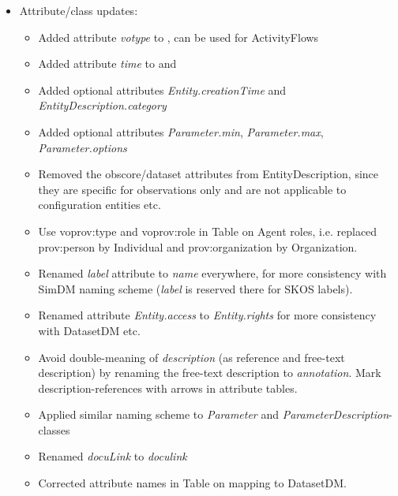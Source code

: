 \begin{itemize}
\item Attribute/class updates:
\begin{itemize}
    \item Added attribute \emph{votype} to , can be used for ActivityFlows
    \item Added attribute \emph{time} to  and 
    \item Added optional attributes \emph{Entity.creationTime} and \emph{EntityDescription.category}
    \item Added optional attributes \emph{Parameter.min},  \emph{Parameter.max},  \emph{Parameter.options}
    \item Removed the obscore/dataset attributes from EntityDescription, since they are specific for observations only and are not applicable to configuration entities etc.
    \item Use voprov:type and voprov:role in Table on Agent roles, i.e. replaced prov:person by Individual and prov:organization by Organization.
    \item Renamed \emph{label} attribute to \emph{name} everywhere, for more consistency with SimDM naming scheme (\emph{label} is reserved there for SKOS labels).
    \item Renamed attribute \emph{Entity.access} to \emph{Entity.rights} for more consistency with DatasetDM etc.
    \item Avoid double-meaning of \emph{description} (as reference and free-text description) by renaming the free-text description to \emph{annotation}. Mark description-references with arrows in attribute tables.
    \item Applied similar naming scheme to \emph{Parameter} and \emph{ParameterDescription}-classes
    \item Renamed \emph{docuLink} to \emph{doculink}
    \item Corrected attribute names in Table on mapping to DatasetDM.
\end{itemize}
\end{itemize}
